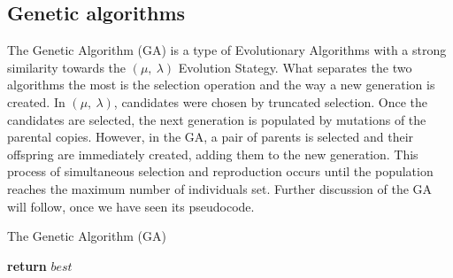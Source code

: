 \subsection{Genetic algorithms}

The Genetic Algorithm (GA) \cite{luke13metaheuristics} is a type of Evolutionary Algorithms with a strong similarity towards the $(\mu,\ \lambda)$ Evolution Stategy. What separates the two algorithms the most is the selection operation and the way a new generation is created. In $(\mu,\ \lambda)$, candidates were chosen by truncated selection. Once the candidates are selected, the next generation is populated by mutations of the parental copies. However, in the GA, a pair of parents is selected and their offspring are immediately created, adding them to the new generation. This process of simultaneous selection and reproduction occurs until the population reaches the maximum number of individuals set. Further discussion of the GA will follow, once we have seen its pseudocode.

\begin{algorithm}[H]
    \caption{The Genetic Algorithm (GA)}
    \begin{algorithmic}[1]
            \EndFor
                    \EndIf
                \EndFor
                 
                \EndFor
            \EndWhile
            \State \textbf{return} $best$
        \EndProcedure
    \end{algorithmic}
\end{algorithm}

